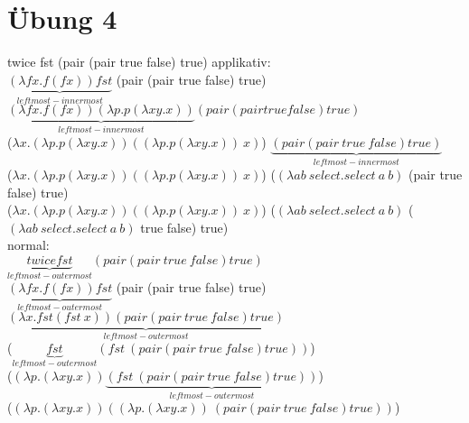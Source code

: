 \documentclass{article}
\begin{document}
	\section{Übung 4}
	twice fst (pair (pair true false) true)
	applikativ:\\
	$\underbrace{(\lambda fx.f(fx)) fst}_{leftmost-innermost}$ (pair (pair true false) true)\\
	$\underbrace{(\lambda fx.f(fx)) (\lambda p.p(\lambda xy.x))}_{leftmost-innermost} (pair (pair true false) true)$\\
	($\lambda x.(\lambda p.p(\lambda xy.x))((\lambda p.p(\lambda xy.x))\ x)$)  $\underbrace{(pair (pair\ true\ false) true)}_{leftmost-innermost}$\\
	($\lambda x.(\lambda p.p(\lambda xy.x))((\lambda p.p(\lambda xy.x))\ x)$)  ($(\lambda ab\ select.select\ a\ b )$ (pair true false) true)\\
	($\lambda x.(\lambda p.p(\lambda xy.x))((\lambda p.p(\lambda xy.x))\ x)$)  ($(\lambda ab\ select.select\ a\ b )$ ($(\lambda ab\ select.select\ a\ b )$ true false) true)\\
	normal:\\
	$\underbrace{twice fst}_{leftmost-outermost} (pair (pair\ true\ false) true)$\\
	$\underbrace{(\lambda fx.f(fx)) fst}_{leftmost-outermost}$ (pair (pair true false) true)\\
	$\underbrace{(\lambda x.fst(fst\ x)) (pair (pair\ true\ false) true)}_{leftmost-outermost}$\\
	($\underbrace{fst}_{leftmost-outermost}(fst\ (pair (pair\ true\ false) true))$)\\
	($(\lambda p.(\lambda xy.x))\underbrace{(fst\ (pair (pair\ true\ false) true))}_{leftmost-outermost}$)\\
	($(\lambda p.(\lambda xy.x))((\lambda p.(\lambda xy.x))\ (pair (pair\ true\ false) true))$)\\


	
\end{document}

